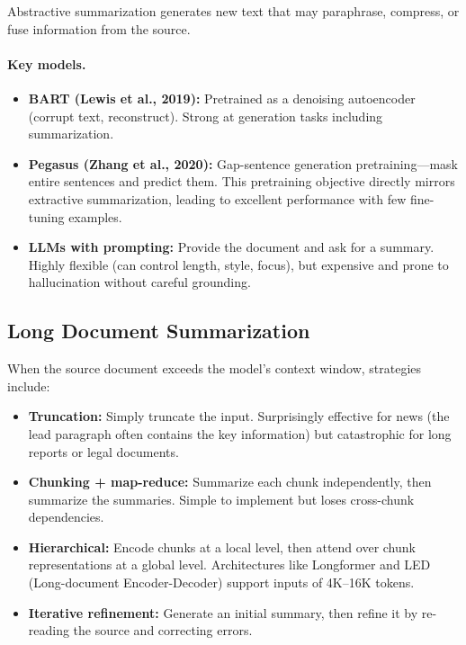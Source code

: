 Abstractive summarization generates new text that may paraphrase, compress, or fuse
information from the source.

\paragraph{Key models.}
\begin{itemize}
    \item \textbf{BART (Lewis et al., 2019):} Pretrained as a denoising autoencoder (corrupt
          text, reconstruct).  Strong at generation tasks including summarization.
    \item \textbf{Pegasus (Zhang et al., 2020):} Gap-sentence generation pretraining---mask
          entire sentences and predict them.  This pretraining objective directly mirrors
          extractive summarization, leading to excellent performance with few fine-tuning
          examples.
    \item \textbf{LLMs with prompting:} Provide the document and ask for a summary.  Highly
          flexible (can control length, style, focus), but expensive and prone to hallucination
          without careful grounding.
\end{itemize}

\subsection{Long Document Summarization}

When the source document exceeds the model's context window, strategies include:

\begin{itemize}
    \item \textbf{Truncation:} Simply truncate the input.  Surprisingly effective for news
          (the lead paragraph often contains the key information) but catastrophic for long
          reports or legal documents.
    \item \textbf{Chunking + map-reduce:} Summarize each chunk independently, then summarize
          the summaries.  Simple to implement but loses cross-chunk dependencies.
    \item \textbf{Hierarchical:} Encode chunks at a local level, then attend over chunk
          representations at a global level.  Architectures like Longformer and LED
          (Long-document Encoder-Decoder) support inputs of 4K--16K tokens.
    \item \textbf{Iterative refinement:} Generate an initial summary, then refine it by
          re-reading the source and correcting errors.
\end{itemize}

